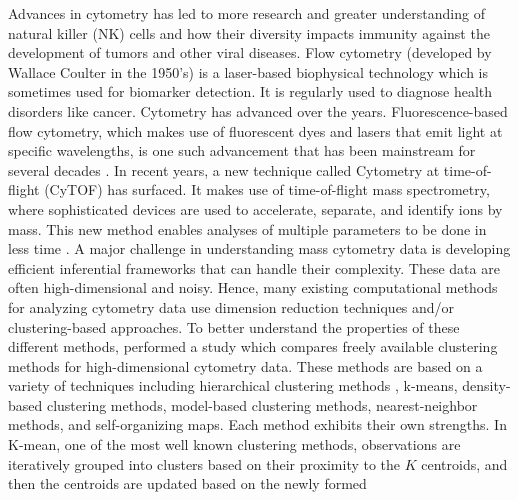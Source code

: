 \documentclass[12pt,]{article}
\def\Z{\bm{Z}}
\begin{document}
Advances in cytometry has led to more research and greater understanding  of
natural killer (NK) cells and how their diversity impacts immunity against the
development of tumors and other viral diseases. Flow cytometry (developed by
Wallace Coulter in the 1950's) is a laser-based biophysical technology which is
sometimes used for biomarker detection. It is regularly used to diagnose health
disorders like cancer. Cytometry has advanced over the years.
Fluorescence-based flow cytometry, which makes use of fluorescent dyes and
lasers that emit light at specific wavelengths, is one such advancement that
has been mainstream for several decades \citep{herzenberg2002history}.  In recent
years, a new technique called Cytometry at time-of-flight (CyTOF) has surfaced.
It makes use of time-of-flight mass spectrometry, where sophisticated devices
are used to accelerate, separate, and identify ions by mass. This new method
enables analyses of multiple parameters to be done in less time
\citep{cheung2011screening}. 
A major challenge in understanding mass cytometry data is developing efficient
inferential frameworks that can handle their complexity. These data are often
high-dimensional and noisy. Hence, many existing computational methods for
analyzing cytometry data use dimension reduction techniques and/or
clustering-based approaches.
%
%
To better understand the properties of these different methods, 
\cite{weber2016comparison} performed a study which compares freely available
clustering methods for high-dimensional cytometry data. These methods are based
on a variety of techniques including hierarchical clustering methods , k-means,
density-based clustering methods, model-based clustering methods,
nearest-neighbor methods, and self-organizing maps. Each method exhibits their
own strengths.
In K-mean, one of the most well known clustering methods, observations are
iteratively grouped into clusters based on their proximity to the $K$
centroids, and then the centroids are updated based on the newly formed
\end{document}
